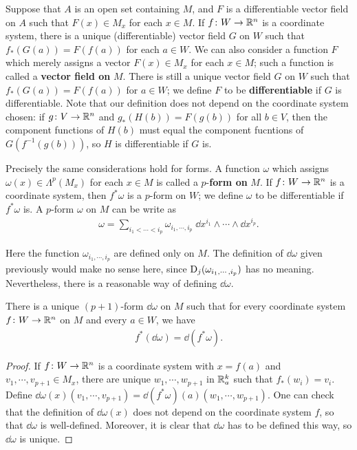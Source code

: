 Suppose that $A$ is an open set containing $M$, and $F$ is a differentiable vector 
field on $A$ such that $F(x)\in M_x$ for each $x\in M$. If $f\colon{}W\to \mathbb{R}^n$ is a coordinate 
system, there is a unique (differentiable) vector field $G$ on $W$ such that 
$f_*(G(a)) = F(f(a))$ for each $a\in W$. We can also consider a function $F$ which merely assigns 
a vector $F(x)\in M_x$ for each $x\in M$; such a function is called a \textbf{vector field on} $M$. 
There is still a unique vector field $G$ on $W$ such that $f_*(G(a)) = F(f(a))$ for $a\in W$; we 
define $F$ to be \textbf{differentiable} if $G$ is differentiable. Note that our definition does not depend 
on the coordinate system chosen: if $g\colon{}V\to\mathbb{R}^n$ and $g_*(H(b))=F(g(b))$ for all $b\in V$, then the 
component functions of $H(b)$ must equal the component fucntions of $G(f^{-1}(g(b)))$, so $H$ is 
differentiable if $G$ is.

Precisely the same considerations hold for forms. A function $\omega$ which 
assigns $\omega(x)\in\Lambda^p(M_x)$ for each $x\in M$ is called a $p$-\textbf{form on} $M$. If 
$f\colon{}W\to \mathbb{R}^n$ is a coordinate system, then $f^*\omega$ is a $p$-form on $W$; we 
define $\omega$ to be differentiable if $f^*\omega$ is. A $p$-form $\omega$ on $M$ can be 
write as 
\begin{align*}
  \omega = \sum_{i_1<\cdots<i_p}^{}{\omega_{i_1,\cdots,i_p}\;\dd x^{i_1}\wedge\cdots\wedge\dd x^{i_p}}.  
\end{align*}

Here the function $\omega_{i_1,\cdots,i_p}$ are defined only on $M$. The definition of $\dd \omega$ 
given previously would make no sense here, since $\mathrm{D}_j(\omega_{i_1,\cdots,i_p})$ has no meaning. 
Nevertheless, there is a reasonable way of defining $\dd\omega$.

\begin{theorem}
    There is a unique $(p+1)$-form $\dd\omega$ on $M$ such that for every 
    coordinate system $f\colon{}W\to \mathbb{R}^n$ on $M$ and every $a\in W$, we have 
    \begin{align*}
      f^*(\dd\omega) = \dd (f^*\omega).
    \end{align*}
\end{theorem}

\begin{proof}
    If $f\colon{}W\to\mathbb{R}^n$ is a coordinate system with $x=f(a)$ and $v_1,\cdots,v_{p+1}\in M_x$,
    there are unique $w_1,\cdots,w_{p+1}$ in $\mathbb{R}^k_a$ such that $f_*(w_i) = v_i$. 
    Define $\dd\omega(x)(v_1,\cdots,v_{p+1}) = \dd(f^*\omega)(a)(w_1,\cdots,w_{p+1})$. One can 
    check that the definition of $\dd\omega(x)$ does not depend on the coordinate system $f$,
    so that $\dd\omega$ is well-defined. Moreover, it is clear that $\dd\omega$ has to be 
    defined this way, so $\dd\omega$ is unique.
\end{proof}

